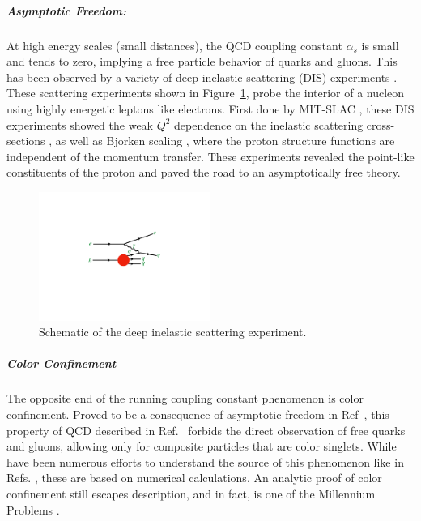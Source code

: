 \subparagraph{Asymptotic Freedom: }
At high energy scales (small distances), the QCD coupling constant $\alpha_s$ is small and tends to zero, implying a free particle 
behavior of quarks and gluons\cite{PhysRevLett.30.1343, PhysRevD.8.3633}. This has been observed by a variety of deep inelastic 
scattering (DIS) experiments \cite{Deur:2014vea, Kim:1998kia, Altarelli:1996nm, RevModPhys.63.597, Kataev:2001kk, Alekhin:2012ig, Alekhin:2013nua, Blumlein:2006be, Aaron:2007xx, Chekanov:2007pa, Chekanov:2008af, Abramowicz:2010cka, Abramowicz:2010ke, Aaron:2009vs}. 
These scattering experiments shown in Figure~\ref{fig:dis_schematic}, probe the interior of a nucleon using highly energetic leptons like electrons. First done by 
MIT-SLAC \cite{PhysRevLett.23.930, PhysRevLett.23.935}, these DIS experiments showed the weak $Q^2$ dependence on the inelastic scattering cross-sections
, as well as Bjorken scaling \cite{PhysRev.179.1547}, where the proton structure functions are independent of the momentum transfer. These experiments revealed 
the point-like constituents of the proton and paved the road to an asymptotically free theory.

\begin{figure}[htbp]
\begin{center}
\includegraphics[width=0.5\textwidth]{figures/theory/DIS}
\caption{Schematic of the deep inelastic scattering experiment.}
\label{fig:dis_schematic}
\end{center}
\end{figure}


\subparagraph{Color Confinement}
The opposite end of the running coupling constant phenomenon is color confinement. Proved to be a consequence of asymptotic freedom
in Ref~\cite{Nishijima1996}, this property of QCD described in Ref.~\cite{PhysRevD.10.2445} forbids the direct observation of free quarks
and gluons, allowing only for composite particles that are color singlets. While have been numerous efforts to understand the source of this
phenomenon like in Refs. \cite{BUCHMULLER1982479, KOGUT1976199, PhysRevD.31.2910, PhysRevD.57.2603, PhysRevD.62.114503, RevModPhys.55.775, PhysRevLett.90.102001}, these are based on numerical calculations. An analytic proof of color confinement still escapes description,
and in fact, is one of the Millennium Problems \cite{MillenniumProb}. 


